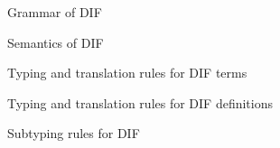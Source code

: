 \documentclass{article}
\begin{document}

\begin{figure}[h]
    
    \caption{Grammar of DIF}
    \label{grammar}
\end{figure}

\begin{figure}[h]
    
    \caption{Semantics of DIF}
    \label{semantics}
\end{figure}

\begin{figure}[h]
    
    \caption{Typing and translation rules for DIF terms}
    \label{typing_rules_terms}
\end{figure}

\begin{figure}[h]
    
    \caption{Typing and translation rules for DIF definitions}
    \label{typing_rules_definitions}
\end{figure}

\begin{figure}[h]
    
    \caption{Subtyping rules for DIF}
    \label{subtyping_rules}
\end{figure}
\end{document}
